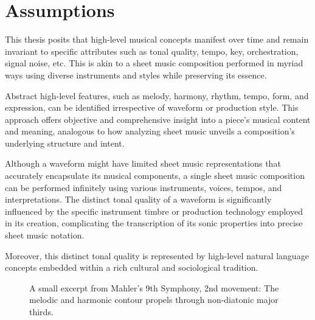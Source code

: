 \section{Assumptions}

This thesis posits that high-level musical concepts manifest over time and remain invariant to specific attributes such as tonal quality, tempo, key, orchestration, signal noise, etc. This is akin to a sheet music composition performed in myriad ways using diverse instruments and styles while preserving its essence.

Abstract high-level features, such as melody, harmony, rhythm, tempo, form, and expression, can be identified irrespective of waveform or production style. This approach offers objective and comprehensive insight into a piece's musical content and meaning, analogous to how analyzing sheet music unveils a composition's underlying structure and intent.

Although a waveform might have limited sheet music representations that accurately encapsulate its musical components, a single sheet music composition can be performed infinitely using various instruments, voices, tempos, and interpretations. The distinct tonal quality of a waveform is significantly influenced by the specific instrument timbre or production technology employed in its creation, complicating the transcription of its sonic properties into precise sheet music notation.

Moreover, this distinct tonal quality is represented by high-level natural language concepts embedded within a rich cultural and sociological tradition.


\begin{figure}
    \centering
    \caption[Mahler's 9th Symphony, 2nd movement]{\small{A small excerpt from Mahler's 9th Symphony, 2nd movement: The melodic and harmonic contour propels through non-diatonic major thirds.}}
    \label{fig:mahler}
\end{figure}

